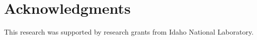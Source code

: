 \documentclass{mc2015}
\begin{document}
%
%
%
%
\section{Acknowledgments}
This research was supported by research grants from Idaho National Laboratory.

\setlength{\baselineskip}{12pt}


%


%
\end{document}
